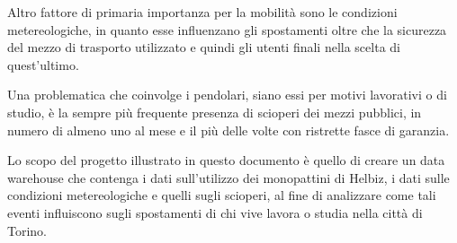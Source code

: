 Altro fattore di primaria importanza per la mobilità sono le condizioni metereologiche,
in quanto esse influenzano gli spostamenti oltre che la sicurezza del mezzo di
trasporto utilizzato e quindi gli utenti finali nella scelta di quest'ultimo. 

Una problematica che coinvolge i pendolari, siano essi per motivi lavorativi o di
studio, è la sempre più frequente presenza di scioperi dei mezzi pubblici, in numero
di almeno uno al mese e il più delle volte con ristrette fasce di garanzia.

Lo scopo del progetto illustrato in questo documento è quello di creare un data
warehouse che contenga i dati sull'utilizzo dei monopattini di Helbiz, i dati sulle
condizioni metereologiche e quelli sugli scioperi, al fine di analizzare come tali
eventi influiscono sugli spostamenti di chi vive lavora o studia nella città di Torino.
